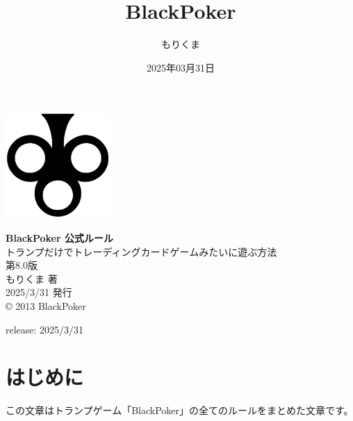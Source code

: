 \documentclass[letterpaper,10pt,dvipdfmx]{sphinxmanual}
\title{BlackPoker}
\date{2025年03月31日}
\author{もりくま}
\begin{document}
\pagestyle{empty}

\begin{titlepage}
\begin{center}
\vspace*{25mm}

\includegraphics[width=4cm]{blackpoker_logo.pdf}  %

\vspace{20mm}
{\Huge \textbf{BlackPoker 公式ルール}}\\[10mm]
{\Large トランプだけでトレーディングカードゲームみたいに遊ぶ方法}\\[30mm]

{\huge 第8.0版}\\[20mm]

{\Large もりくま 著} \\[5mm]
{\Large 2025/3/31 発行}\\[10mm]

{\small © 2013 BlackPoker}

\end{center}
\end{titlepage}

\clearpage
\thispagestyle{empty}  %
\null                  %
\clearpage             %

\pagestyle{plain}
\sphinxtableofcontents
\pagestyle{normal}
\label{\detokenize{index::doc}}


\sphinxAtStartPar
release: 2025/3/31

\sphinxstepscope


\chapter{はじめに}
\label{\detokenize{init/init:init-rst}}\label{\detokenize{init/init:id1}}\label{\detokenize{init/init::doc}}
\sphinxAtStartPar
この文章はトランプゲーム「BlackPoker」の全てのルールをまとめた文章です。
\end{document}
